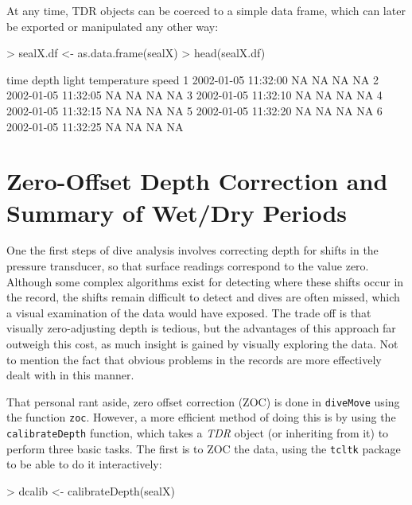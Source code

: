 \documentclass[12pt, letterpaper]{scrartcl}
\newcommand{\Rfunction}[1]{{\texttt{#1}}}
\newcommand{\Rpackage}[1]{{\texttt{#1}}}
\newcommand{\Rclass}[1]{{\textit{#1}}}
\begin{document}
At any time, TDR objects can be coerced to a simple data frame, which can
later be exported or manipulated any other way:
\begin{Schunk}
\begin{Sinput}
> sealX.df <- as.data.frame(sealX)
> head(sealX.df)
\end{Sinput}
\begin{Soutput}
                 time depth light temperature speed
1 2002-01-05 11:32:00    NA    NA          NA    NA
2 2002-01-05 11:32:05    NA    NA          NA    NA
3 2002-01-05 11:32:10    NA    NA          NA    NA
4 2002-01-05 11:32:15    NA    NA          NA    NA
5 2002-01-05 11:32:20    NA    NA          NA    NA
6 2002-01-05 11:32:25    NA    NA          NA    NA
\end{Soutput}
\end{Schunk}


\section[ZOC and Wet/Dry period detection]{Zero-Offset Depth Correction
  and Summary of Wet/Dry Periods}
\label{sec:zoc}

One the first steps of dive analysis involves correcting depth for shifts
in the pressure transducer, so that surface readings correspond to the
value zero.  Although some complex algorithms exist for detecting where
these shifts occur in the record, the shifts remain difficult to detect
and dives are often missed, which a visual examination of the data would
have exposed.  The trade off is that visually zero-adjusting depth is
tedious, but the advantages of this approach far outweigh this cost, as
much insight is gained by visually exploring the data.  Not to mention the
fact that obvious problems in the records are more effectively dealt with
in this manner.

That personal rant aside, zero offset correction (ZOC) is done in
\Rpackage{diveMove} using the function \Rfunction{zoc}.  However, a more
efficient method of doing this is by using the \Rfunction{calibrateDepth}
function, which takes a \Rclass{TDR} object (or inheriting from it) to
perform three basic tasks.  The first is to ZOC the data, using the
\Rpackage{tcltk} package to be able to do it interactively:
\begin{Schunk}
\begin{Sinput}
> dcalib <- calibrateDepth(sealX)
\end{Sinput}
\end{Schunk}
\end{document}
